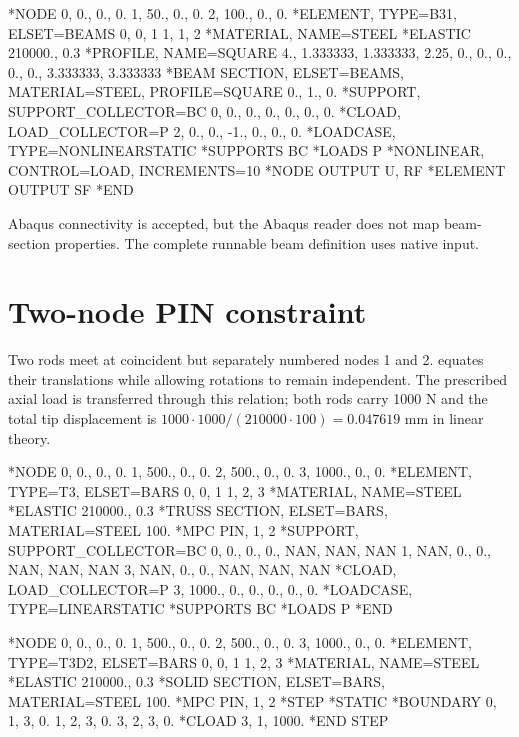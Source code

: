\begin{dialectexamples}
\begin{femasterdeck}
*NODE
0,   0., 0., 0.
1,  50., 0., 0.
2, 100., 0., 0.
*ELEMENT, TYPE=B31, ELSET=BEAMS
0, 0, 1
1, 1, 2
*MATERIAL, NAME=STEEL
*ELASTIC
210000., 0.3
*PROFILE, NAME=SQUARE
4., 1.333333, 1.333333, 2.25,
0., 0., 0., 0., 0., 3.333333, 3.333333
*BEAM SECTION, ELSET=BEAMS,
 MATERIAL=STEEL, PROFILE=SQUARE
0., 1., 0.
*SUPPORT, SUPPORT_COLLECTOR=BC
0, 0., 0., 0., 0., 0., 0.
*CLOAD, LOAD_COLLECTOR=P
2, 0., 0., -1., 0., 0., 0.
*LOADCASE, TYPE=NONLINEARSTATIC
*SUPPORTS
BC
*LOADS
P
*NONLINEAR, CONTROL=LOAD, INCREMENTS=10
*NODE OUTPUT
U, RF
*ELEMENT OUTPUT
SF
*END
\end{femasterdeck}
\begin{noabaqus}
Abaqus  connectivity is accepted, but the Abaqus reader does not map beam-section properties. The complete runnable beam definition uses native input.
\end{noabaqus}
\end{dialectexamples}

\section{Two-node PIN constraint}

Two rods meet at coincident but separately numbered nodes 1 and 2.  equates their translations while allowing rotations to remain independent. The prescribed axial load is transferred through this relation; both rods carry 1000 N and the total tip displacement is \(1000\cdot1000/(210000\cdot100)=0.047619\) mm in linear theory.

\begin{dialectexamples}
\begin{femasterdeck}
*NODE
0,    0., 0., 0.
1,  500., 0., 0.
2,  500., 0., 0.
3, 1000., 0., 0.
*ELEMENT, TYPE=T3, ELSET=BARS
0, 0, 1
1, 2, 3
*MATERIAL, NAME=STEEL
*ELASTIC
210000., 0.3
*TRUSS SECTION, ELSET=BARS, MATERIAL=STEEL
100.
*MPC
PIN, 1, 2
*SUPPORT, SUPPORT_COLLECTOR=BC
0, 0., 0., 0., NAN, NAN, NAN
1, NAN, 0., 0., NAN, NAN, NAN
3, NAN, 0., 0., NAN, NAN, NAN
*CLOAD, LOAD_COLLECTOR=P
3, 1000., 0., 0., 0., 0., 0.
*LOADCASE, TYPE=LINEARSTATIC
*SUPPORTS
BC
*LOADS
P
*END
\end{femasterdeck}
\begin{abaqusdeck}
*NODE
0,    0., 0., 0.
1,  500., 0., 0.
2,  500., 0., 0.
3, 1000., 0., 0.
*ELEMENT, TYPE=T3D2, ELSET=BARS
0, 0, 1
1, 2, 3
*MATERIAL, NAME=STEEL
*ELASTIC
210000., 0.3
*SOLID SECTION, ELSET=BARS, MATERIAL=STEEL
100.
*MPC
PIN, 1, 2
*STEP
*STATIC
*BOUNDARY
0, 1, 3, 0.
1, 2, 3, 0.
3, 2, 3, 0.
*CLOAD
3, 1, 1000.
*END STEP
\end{abaqusdeck}
\end{dialectexamples}

